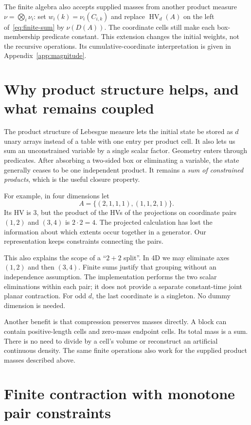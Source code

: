 \documentclass[12pt,a4paper]{article}
\theoremstyle{definition}
\newcommand{\HV}{\operatorname{HV}}
\begin{document}
The finite algebra also accepts supplied masses from another product
measure $\nu=\bigotimes_i\nu_i$: set $w_i(k)=\nu_i(C_{i,k})$ and replace
$\HV_d(A)$ on the left of~\eqref{eq:finite-sum} by $\nu(D(A))$.
The coordinate cells still make each box-membership predicate constant.
This extension changes the initial weights, not the recursive operations.
Its cumulative-coordinate interpretation is given in Appendix~\ref{app:magnitude}.

\section{Why product structure helps, and what remains coupled}
\label{sec:structure}

The product structure of Lebesgue measure lets the initial state be
stored as $d$ unary arrays
instead of a table with one entry per product cell. It also lets us sum
an unconstrained variable by a single scalar factor. Geometry enters
through predicates. After absorbing a two-sided box or eliminating a
variable, the state generally ceases to be one independent product.
It remains a \emph{sum of constrained products}, which is the useful
closure property.

For example, in four dimensions let
\[
 A=\{(2,1,1,1),(1,1,2,1)\}.
\]
Its HV is $3$, but the product of the HVs of the projections on coordinate
pairs $(1,2)$ and $(3,4)$ is $2\cdot2=4$. The projected calculation has
lost the information about which extents occur together in a generator.
Our representation keeps constraints connecting the pairs.

This also explains the scope of a ``$2+2$ split''. In 4D we may eliminate
axes $(1,2)$ and then $(3,4)$. Finite sums justify that grouping without
an independence assumption. The implementation performs the two scalar
eliminations within each pair; it does not provide a separate constant-time
joint planar contraction. For odd $d$, the last coordinate is a singleton.
No dummy dimension is needed.

Another benefit is that compression preserves masses directly. A block
can contain positive-length cells and zero-mass endpoint cells.
Its total mass is a sum. There is no need to divide by a cell's volume or
reconstruct an artificial continuous density. The same finite operations
also work for the supplied product masses described above.

\section{Finite contraction with monotone pair constraints}
\label{sec:contraction}
\end{document}
